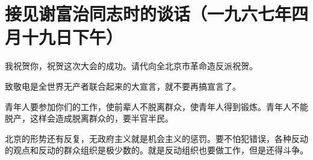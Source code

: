 \section[接见谢富治同志时的谈话（一九六七年四月十九日下午）]{接见谢富治同志时的谈话（一九六七年四月十九日下午）}


我祝贺你，祝贺这次大会的成功。请代向全北京市革命造反派祝贺。

致敬电是全世界无产者联合起来的大宣言，就不要再搞宣言了。

青年人要参加你们的工作，使前辈人不脱离群众，使青年人得到锻炼。青年人不能脱产，这样会造成脱离群众的，要半官半民。

北京的形势还有反复，无政府主义就是机会主义的惩罚。要不怕犯错误，各种反动的观点和反动的群众组织是极少数的。就是反动组织也要做工作，但是还得斗争。


